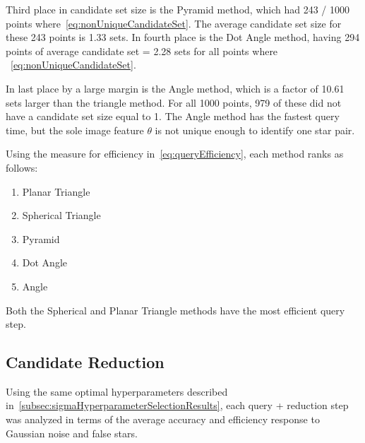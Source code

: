 Third place in candidate set size is the Pyramid method, which had 243 / 1000 points
where~\autoref{eq:nonUniqueCandidateSet}.
The average candidate set size for these 243 points is 1.33 sets.
In fourth place is the Dot Angle method, having 294 points of average candidate set = 2.28 sets for all points where
~\autoref{eq:nonUniqueCandidateSet}.

In last place by a large margin is the Angle method, which is a factor of 10.61 sets larger than the triangle method.
For all 1000 points, 979 of these did not have a candidate set size equal to 1.
The Angle method has the fastest query time, but the sole image feature $\theta$ is not unique enough to identify one
star pair.

Using the measure for efficiency in~\autoref{eq:queryEfficiency}, each method ranks as follows:
\begin{multicols}{2}
    \begin{enumerate}
        \item Planar Triangle
        \item Spherical Triangle
        \item Pyramid
        \item Dot Angle
        \item Angle
    \end{enumerate}
\end{multicols}

Both the Spherical and Planar Triangle methods have the most efficient query step.

\subsection{Candidate Reduction}\label{subsec:candidateReductionResults}
Using the same optimal hyperparameters described in~\autoref{subsec:sigmaHyperparameterSelectionResults}, each query +
reduction step was analyzed in terms of the average accuracy and efficiency response to Gaussian noise and false stars.

\begin{figure}
\end{figure}


